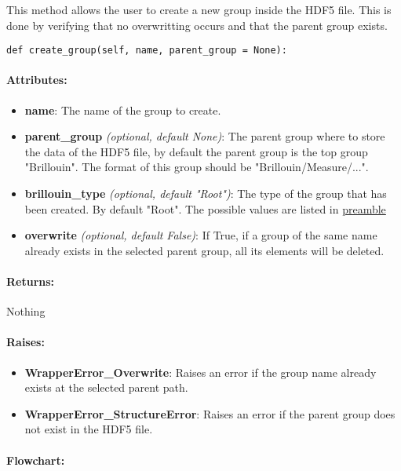 This method allows the user to create a new group inside the HDF5 file. This is done by verifying that no overwritting occurs and that the parent group exists.

\begin{lstlisting}
def create_group(self, name, parent_group = None):
\end{lstlisting}

\paragraph{Attributes:}

\begin{itemize}
    \item \textbf{name}: The name of the group to create.
    \item \textbf{parent\_group} \textit{(optional, default None)}: The parent group where to store the data of the HDF5 file, by default the parent group is the top group "Brillouin". The format of this group should be "Brillouin/Measure/...". 
    \item \textbf{brillouin\_type} \textit{(optional, default "Root")}: The type of the group that has been created. By default "Root". The possible values are listed in \hyperref[subsec:preamble.file_structure.complete_structure]{preamble}
    \item \textbf{overwrite} \textit{(optional, default False)}: If True, if a group of the same name already exists in the selected parent group, all its elements will be deleted.
\end{itemize}

\paragraph{Returns:} Nothing

\paragraph{Raises:}

\begin{itemize}
    \item \textbf{WrapperError\_Overwrite}: Raises an error if the group name already exists at the selected parent path.
    \item \textbf{WrapperError\_StructureError}: Raises an error if the parent group does not exist in the HDF5 file.
\end{itemize}

\paragraph{Flowchart:}

